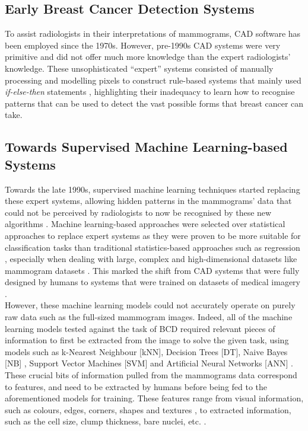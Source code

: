 \subsection{Early Breast Cancer Detection Systems}
\label{sec:litreview-bcd-early-cad}

To assist radiologists in their interpretations of mammograms, CAD software has been employed since the 1970s. However, pre-1990s CAD systems were very primitive and did not offer much more knowledge than the expert radiologists' knowledge. These unsophisticated ``expert'' systems consisted of manually processing and modelling pixels to construct rule-based systems that mainly used \textit{if-else-then} statements \citep{Litjens2017}, highlighting their inadequacy to learn how to recognise patterns that can be used to detect the vast possible forms that breast cancer can take.

\subsection{Towards Supervised Machine Learning-based Systems}

Towards the late 1990s, supervised machine learning techniques started replacing these expert systems, allowing hidden patterns in the mammograms' data that could not be perceived by radiologists to now be recognised by these new algorithms \citep{Litjens2017}. Machine learning-based approaches were selected over statistical approaches to replace expert systems as they were proven to be more suitable for classification tasks than traditional statistics-based approaches such as regression \citep{Paliwal2009}, especially when dealing with large, complex and high-dimensional datasets like mammogram datasets \citep{Yue2018}. This marked the shift from CAD systems that were fully designed by humans to systems that were trained on datasets of medical imagery \citep{Litjens2017}.\\

However, these machine learning models could not accurately operate on purely raw data such as the full-sized mammogram images. Indeed, all of the machine learning models tested against the task of BCD required relevant pieces of information to first be extracted from the image to solve the given task, using models such as k-Nearest Neighbour [kNN], Decision Trees [DT], Naive Bayes [NB] \citep{Asri2016}, Support Vector Machines [SVM] \citep{Ramos-Pollan2012} and Artificial Neural Networks [ANN] \citep{Yue2018}. These crucial bits of information pulled from the mammograms data correspond to features, and need to be extracted by humans before being fed to the aforementioned models for training. These features range from visual information, such as colours, edges, corners, shapes and textures \citep{Li2008}, to extracted information, such as the cell size, clump thickness, bare  nuclei, etc. \citep{Yue2018}.\\

